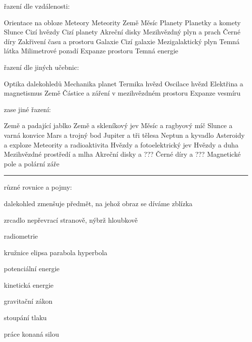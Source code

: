 





\tableofcontents





\vfill\eject

\begingroup
\let\oldpar=\par\def\par{\oldpar\leavevmode}
\obeylines\obeyspaces

řazení dle vzdálenosti:

Orientace na obloze
Meteory
Meteority
Země
Měsíc
Planety
Planetky a komety
Slunce
Cizí hvězdy
Cizí planety
Akreční disky
Mezihvězdný plyn a prach
Černé díry
Zakřivení času a prostoru
Galaxie
Cizí galaxie
Mezigalaktický plyn
Temná látka
Milimetrové pozadí
Expanze prostoru
Temná energie


řazení dle jiných učebnic:

Optika dalekohledů
Mechanika planet
Termika hvězd
Oscilace hvězd
Elektřina a magnetismus Země
Částice a záření v mezihvězdném prostoru
Expanze vesmíru


zase jiné řazení:

Země a padající jablko
Země a skleníkový jev
Měsíc a ragbyový míč
Slunce a varná konvice
Mars a trojný bod
Jupiter a tři tělesa
Neptun a kyvadlo
Asteroidy a exploze
Meteority a radioaktivita
Hvězdy a fotoelektrický jev
Hvězdy a duha
Mezihvězdné prostředí a mlha
Akreční disky a ???
Černé díry a ???
Magnetické pole a polární záře


\endgroup

\hrule


různé rovnice a pojmy:

dalekohled zmenšuje předmět, na jehož obraz se díváme zblízka

zrcadlo nepřevrací stranově, nýbrž hloubkově

radiometrie

kružnice
elipsa
parabola
hyperbola

potenciální energie

kinetická energie

gravitační zákon

stoupání tlaku

práce konaná silou

